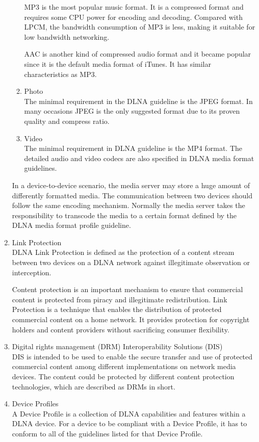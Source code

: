 \begin{enumerate}
\begin{enumerate}
MP3 is the most popular music format. It is a compressed format and requires 
some CPU power for encoding and decoding. Compared with LPCM, the bandwidth consumption of MP3 is less, making it suitable for low bandwidth networking. 

AAC is another kind of compressed audio format and it became popular since it is the default media format of iTunes. It has similar characteristics as MP3. 
\item Photo \\ 
The minimal requirement in the DLNA guideline is the JPEG format. In many occasions JPEG is the only suggested format due to its proven quality and compress ratio. 
\item Video \\ 
The minimal requirement in DLNA guideline is the MP4 format. The detailed audio and video codecs are also specified in DLNA media format guidelines. 
\end{enumerate} 
In a device-to-device scenario, the media server may store a huge amount of differently 
formatted media. The communication between two devices should follow the same encoding mechanism. Normally the media server takes the responsibility to transcode the media to a certain format defined by the DLNA media format profile guideline. 
\item Link Protection \\ 
DLNA Link Protection is defined as the protection of a content stream between two 
devices on a DLNA network against illegitimate observation or interception. 

Content protection is an important mechanism to ensure that commercial content is protected 
from piracy and illegitimate redistribution. Link Protection is a technique that enables the
distribution of protected commercial content on a home network. It provides protection for copyright holders and content providers without sacrificing consumer flexibility. 
\item Digital rights management (DRM) Interoperability Solutions (DIS) \\ 
DIS is intended to be used to enable the secure transfer and use of protected 
commercial content among different implementations on network media devices. 
The content could be protected by different content protection technologies, 
which are described as DRMs in short. 
\item Device Profiles \\ 
A Device Profile is a collection of DLNA capabilities and features within a DLNA device. For a device 
to be compliant with a Device Profile, it has to conform to all of the guidelines listed for that 
Device Profile. 


\end{enumerate}
